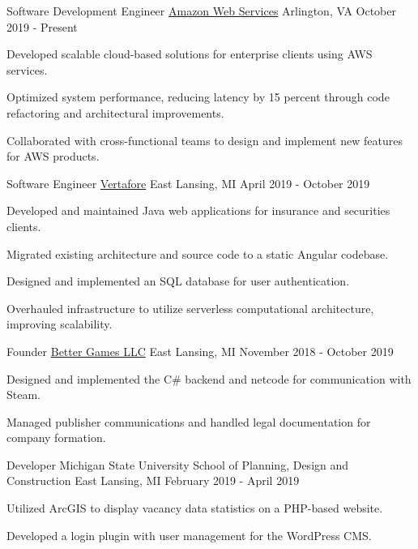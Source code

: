 
\begin{cventries}

  \cventry
    {Software Development Engineer} %
    {\href{https://aws.amazon.com}{Amazon Web Services}} %
    {Arlington, VA} %
    {October 2019 - Present} %
    {
      \begin{cvitems}
        \item {Developed scalable cloud-based solutions for enterprise clients using AWS services.}
        \item {Optimized system performance, reducing latency by 15 percent through code refactoring and architectural improvements.}
        \item {Collaborated with cross-functional teams to design and implement new features for AWS products.}
      \end{cvitems}
    }

  \cventry
    {Software Engineer}
    {\href{https://www.vertafore.com}{Vertafore}}
    {East Lansing, MI}
    {April 2019 - October 2019}
    {
      \begin{cvitems}
        \item {Developed and maintained Java web applications for insurance and securities clients.}
        \item {Migrated existing architecture and source code to a static Angular codebase.}
        \item {Designed and implemented an SQL database for user authentication.}
        \item {Overhauled infrastructure to utilize serverless computational architecture, improving scalability.}
      \end{cvitems}
    }

  \cventry
    {Founder}
    {\href{https://better-games.org}{Better Games LLC}}
    {East Lansing, MI}
    {November 2018 - October 2019}
    {
      \begin{cvitems}
        \item {Designed and implemented the C\# backend and netcode for communication with Steam.}
        \item {Managed publisher communications and handled legal documentation for company formation.}
      \end{cvitems}
    }

  \cventry
    {Developer}
    {Michigan State University School of Planning, Design and Construction}
    {East Lansing, MI}
    {February 2019 - April 2019}
    {
      \begin{cvitems}
        \item {Utilized ArcGIS to display vacancy data statistics on a PHP-based website.}
        \item {Developed a login plugin with user management for the WordPress CMS.}
      \end{cvitems}
    }


\end{cventries}
